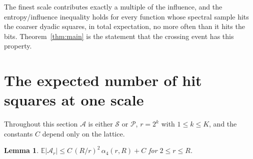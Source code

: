\documentclass[11pt]{amsart}
\newtheorem{lemma}[theorem]{Lemma}
\theoremstyle{remark}
\newcommand{\EE}{\mathbb{E}}
\newcommand{\Sc}{\mathcal{S}}
\newcommand{\Pc}{\mathcal{P}}
\begin{document}
The finest scale contributes exactly a multiple of the influence, and the entropy/influence inequality holds for every function whose spectral sample hits the coarser dyadic squares, in total expectation, no more often than it hits the bits. Theorem~\ref{thm:main} is the statement that the crossing event has this property.

\section{The expected number of hit squares at one scale}\label{sec:onescale}

Throughout this section $\mathcal A$ is either $\Sc$ or $\Pc$, $r=2^k$ with $1\le k\le K$, and the constants $C$ depend only on the lattice.

\begin{lemma}\label{lem:onescale}
$\EE|\mathcal A_r|\le C\,(R/r)^2\,\alpha_4(r,R)+C$ for $2\le r\le R$.
\end{lemma}
\end{document}
